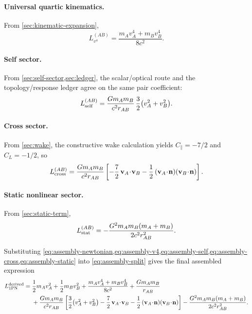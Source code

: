 \documentclass[11pt]{article}
\newcommand{\vct}{\mathbf v}
\newcommand{\nvec}{\mathbf n}
\newcommand{\Cpara}{C_{\parallel}}
\newcommand{\CLong}{C_{L}}
\begin{document}
\paragraph{Universal quartic kinematics.}
From \cref{sec:kinematic-expansion},
\begin{equation}
L_{v^4}^{(AB)}
=
\frac{m_A v_A^4+m_B v_B^4}{8c^2}.
\label{eq:assembly-v4}
\end{equation}

\paragraph{Self sector.}
From \cref{sec:self-sector,sec:ledger}, the scalar/optical route and the
topology/response ledger agree on the same pair coefficient:
\begin{equation}
L_{\rm self}^{(AB)}
=
\frac{Gm_A m_B}{c^2 r_{AB}}\,
\frac32\bigl(v_A^2+v_B^2\bigr).
\label{eq:assembly-self}
\end{equation}

\paragraph{Cross sector.}
From \cref{sec:wake}, the constructive wake calculation yields
\(\Cpara=-7/2\) and \(\CLong=-1/2\), so
\begin{equation}
L_{\rm cross}^{(AB)}
=
\frac{Gm_A m_B}{c^2 r_{AB}}
\left[
-\frac72\,\vct_A\!\cdot\!\vct_B
-\frac12\,(\vct_A\!\cdot\!\nvec)(\vct_B\!\cdot\!\nvec)
\right].
\label{eq:assembly-cross}
\end{equation}

\paragraph{Static nonlinear sector.}
From \cref{sec:static-term},
\begin{equation}
L_{\rm stat}^{(AB)}
=
-\frac{G^2m_A m_B(m_A+m_B)}{2c^2 r_{AB}^2}.
\label{eq:assembly-static}
\end{equation}

Substituting \cref{eq:assembly-newtonian,eq:assembly-v4,eq:assembly-self,eq:assembly-cross,eq:assembly-static}
into \cref{eq:assembly-split} gives the final assembled expression
\begin{align}
L_{\rm 1PN}^{\rm derived}
={}&
\frac12 m_A v_A^2 + \frac12 m_B v_B^2
+ \frac{m_A v_A^4 + m_B v_B^4}{8c^2}
+ \frac{Gm_A m_B}{r_{AB}}
\nonumber\\
&
+ \frac{Gm_A m_B}{c^2 r_{AB}}
\left[
\frac32\bigl(v_A^2+v_B^2\bigr)
-\frac72\,\vct_A\!\cdot\!\vct_B
-\frac12\,(\vct_A\!\cdot\!\nvec)(\vct_B\!\cdot\!\nvec)
\right]
- \frac{G^2m_A m_B(m_A+m_B)}{2c^2 r_{AB}^2}.
\label{eq:derived-eih}
\end{align}
\end{document}

